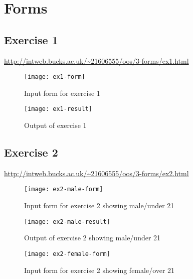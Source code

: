 \chapter{Forms}
\graphicspath{{3-forms/images/}}

\section{Exercise 1}

\url{http://intweb.bucks.ac.uk/~21606555/oos/3-forms/ex1.html}
\captionsetup{type=figure}


\clearpage
\captionsetup{type=figure}


\begin{figure}[H]
  \caption{Input form for exercise 1}
  \centering
  \texttt{[image: ex1-form]}
\end{figure}

\begin{figure}[H]
  \caption{Output of exercise 1}
  \centering
  \texttt{[image: ex1-result]}
\end{figure}

\clearpage
\section{Exercise 2}

\url{http://intweb.bucks.ac.uk/~21606555/oos/3-forms/ex2.html}
\captionsetup{type=figure}


\captionsetup{type=figure}


\begin{figure}[H]
  \caption{Input form for exercise 2 showing male/under 21}
  \centering
  \texttt{[image: ex2-male-form]}
\end{figure}

\begin{figure}[H]
  \caption{Output of exercise 2 showing male/under 21}
  \centering
  \texttt{[image: ex2-male-result]}
\end{figure}

\begin{figure}[H]
  \caption{Input form for exercise 2 showing female/over 21}
  \centering
  \texttt{[image: ex2-female-form]}
\end{figure}

